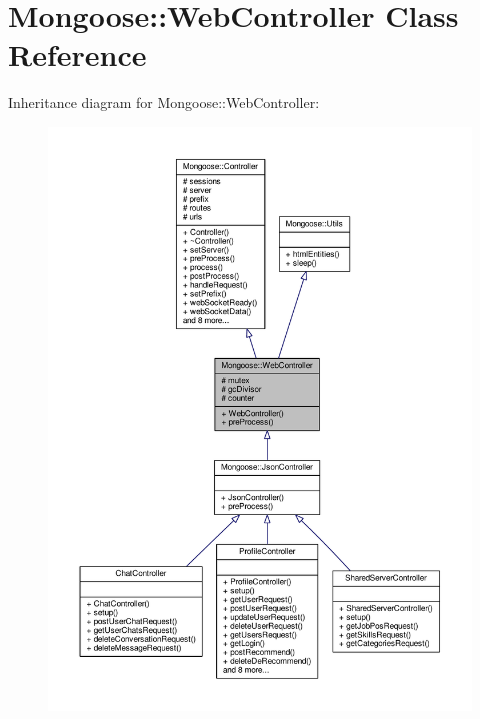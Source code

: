 \hypertarget{classMongoose_1_1WebController}{}\section{Mongoose\+:\+:Web\+Controller Class Reference}
\label{classMongoose_1_1WebController}


Inheritance diagram for Mongoose\+:\+:Web\+Controller\+:
\nopagebreak
\begin{figure}[H]
\begin{center}
\leavevmode
\includegraphics[width=350pt]{da/d58/classMongoose_1_1WebController__inherit__graph}
\end{center}
\end{figure}


